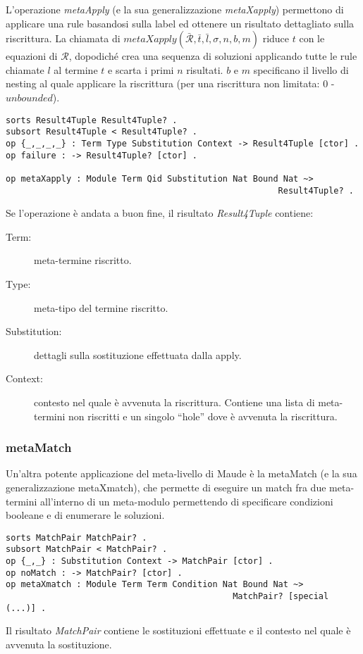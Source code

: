 L'operazione \emph{metaApply} (e la sua generalizzazione \emph{metaXapply})
permettono di applicare una rule basandosi sulla label ed ottenere un risultato dettagliato sulla
riscrittura. La chiamata di $metaXapply(\bar{\mathcal{R}}, \bar{t}, \bar{l},
\sigma, n, b, m)$ riduce $t$ con le equazioni di $\mathcal{R}$, dopodiché crea
una sequenza di soluzioni applicando tutte le rule chiamate $l$ al termine $t$ e
scarta i primi $n$ risultati. $b$ e $m$ specificano il livello di nesting al
quale applicare la riscrittura (per una riscrittura non limitata: 0 -
$unbounded$).
\begin{Verbatim}[fontsize=\small]
sorts Result4Tuple Result4Tuple? .
subsort Result4Tuple < Result4Tuple? .
op {_,_,_,_} : Term Type Substitution Context -> Result4Tuple [ctor] .
op failure : -> Result4Tuple? [ctor] .

op metaXapply : Module Term Qid Substitution Nat Bound Nat ~>
                                                      Result4Tuple? .
\end{Verbatim}
Se l'operazione è andata a buon fine, il risultato \emph{Result4Tuple} contiene:
\begin{description}
  \item[Term:]meta-termine riscritto.
  \item[Type:]meta-tipo del termine riscritto.
  \item[Substitution:]dettagli sulla sostituzione effettuata dalla apply.
  \item[Context:]contesto nel quale è avvenuta la riscrittura. Contiene una
  lista di meta-termini non riscritti e un singolo ``hole'' dove è avvenuta la
  riscrittura.
\end{description}

\subsubsection{metaMatch}
Un'altra potente applicazione del meta-livello di Maude è la metaMatch (e la
sua generalizzazione metaXmatch), che permette di eseguire un match fra due
meta-termini all'interno di un meta-modulo permettendo di specificare condizioni
booleane e di enumerare le soluzioni.
\begin{Verbatim}[fontsize=\small]
sorts MatchPair MatchPair? .
subsort MatchPair < MatchPair? .
op {_,_} : Substitution Context -> MatchPair [ctor] .
op noMatch : -> MatchPair? [ctor] .
op metaXmatch : Module Term Term Condition Nat Bound Nat ~>
                                             MatchPair? [special (...)] .
\end{Verbatim}
Il risultato \emph{MatchPair} contiene le sostituzioni effettuate e il contesto
nel quale è avvenuta la sostituzione.
